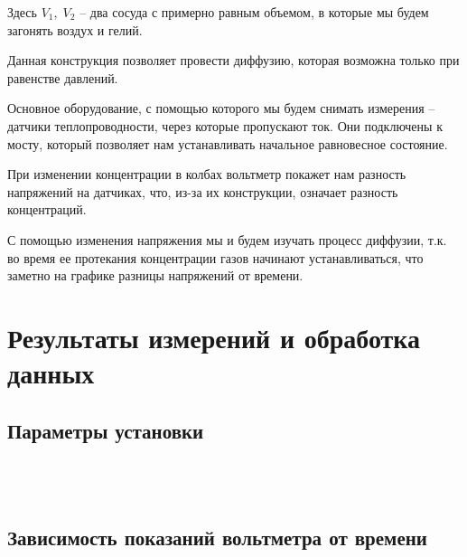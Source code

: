 \documentclass[a4paper,12pt]{article} %
\begin{document}
Здесь $V_1,\; V_2$ -- два сосуда с примерно равным объемом, в которые мы будем загонять воздух и гелий.

Данная конструкция позволяет провести диффузию, которая возможна только при равенстве давлений.

Основное оборудование, с помощью которого мы будем снимать измерения -- датчики теплопроводности, через которые пропускают ток. Они подключены к мосту, который позволяет нам устанавливать начальное равновесное состояние.

При изменении концентрации в колбах вольтметр покажет нам разность напряжений на датчиках, что, из-за их конструкции, означает разность концентраций. 

С помощью изменения напряжения мы и будем изучать процесс диффузии, т.к. во время ее протекания концентрации газов начинают устанавливаться, что заметно на графике разницы напряжений от времени.


\newpage

\section{Результаты измерений и обработка данных}

\subsection*{Параметры установки}

\begin{equation}\label{V}
    
\end{equation}

\begin{equation}\label{LdivS}
    
\end{equation}

\begin{equation}\label{T}
    
\end{equation}

\begin{equation}\label{P}
    
\end{equation}

\subsection*{Зависимость показаний вольтметра от времени}
\end{document}
